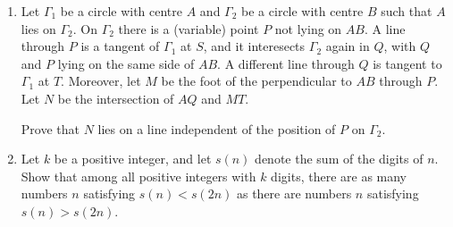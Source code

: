 \documentclass[12pt]{article}
\begin{document}
\begin{enumerate}
\item %
Let $\Gamma_1$ be a circle with centre $A$ and $\Gamma_2$ be a circle with centre $B$ such that $A$ lies on $\Gamma_2$. On $\Gamma_2$ there is a (variable) point $P$ not lying on $AB$. A line through $P$ is a tangent of $\Gamma_1$ at $S$, and it interesects $\Gamma_2$ again in $Q$, with $Q$ and $P$ lying on the same side of $AB$. A different line through $Q$ is tangent to $\Gamma_1$ at $T$. Moreover, let $M$ be the foot of the perpendicular to $AB$ through $P$. Let $N$ be the intersection of $AQ$ and $MT$.

Prove that $N$ lies on a line independent of the position of $P$ on $\Gamma_2$.

\item %
Let $k$ be a positive integer, and let $s(n)$ denote the sum of the digits of $n$. Show that among all positive integers with $k$ digits, there are as many numbers $n$ satisfying $s(n) < s(2n)$ as there are numbers $n$ satisfying $s(n) > s(2n)$.

\end{enumerate}

\vfill

\centering
\begin{BVerbatim}
\end{BVerbatim}
\end{document}
